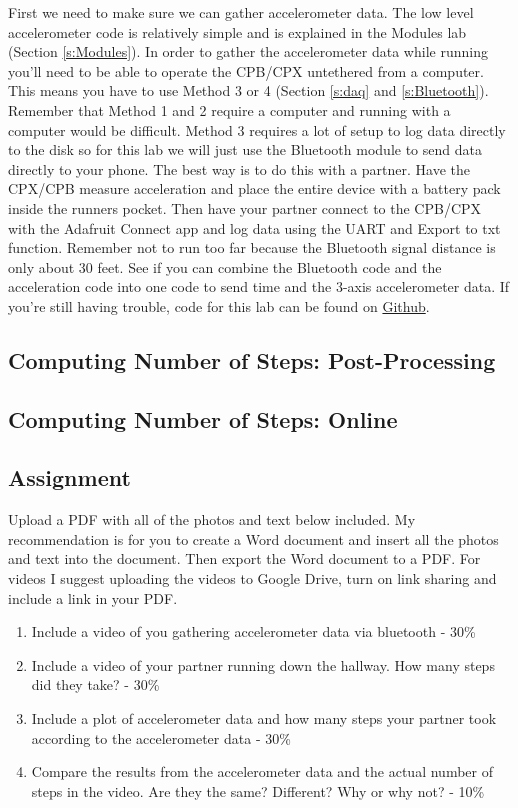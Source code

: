 First we need to make sure we can gather accelerometer data. The low
level accelerometer code is relatively simple and is explained in the
Modules lab (Section \ref{s:Modules}). In order to gather the
accelerometer data while running you'll need to be able to operate the
CPB/CPX untethered from a computer. This means you have to use Method
3 or 4 (Section \ref{s:daq} and \ref{s:Bluetooth}). Remember that
Method 1 and 2 require a computer and running with a computer would be
difficult. Method 3 requires a lot of setup to log data directly to
the disk so for this lab we will just use the Bluetooth module to send
data directly to your phone. The best way is to do this with a
partner. Have the CPX/CPB measure acceleration and place the entire
device with a battery pack inside the runners pocket. Then have your
partner connect to the CPB/CPX with the Adafruit Connect app and log
data using the UART and Export to txt function. Remember not to run
too far because the Bluetooth signal distance is only about 30
feet. See if you can combine the Bluetooth code and the acceleration
code into one code to send time and the 3-axis accelerometer data. If
you're still having trouble, code for this lab can be found
on \href{https://github.com/cmontalvo251/Microcontrollers/tree/master/Circuit_Playground/CircuitPython/pedometer}{Github}.  

\subsection{Computing Number of Steps: Post-Processing}

\subsection{Computing Number of Steps: Online}

\subsection{Assignment}

Upload a PDF with all of the photos and text below included. My recommendation is for you to create a Word document and insert all the photos and text into the document. Then export the Word document to a PDF. For videos I suggest uploading the videos to Google Drive, turn on link sharing and include a link in your PDF.

\begin{enumerate}[itemsep=-5pt]
\item Include a video of you gathering accelerometer data via bluetooth - 30\%
\item Include a video of your partner running down the hallway. How many steps did they take? - 30\%
\item Include a plot of accelerometer data and how many steps your partner took according to the accelerometer data - 30\%
\item Compare the results from the accelerometer data and the actual number of steps in the video. Are they the same? Different? Why or why not? - 10\%
\end{enumerate}

